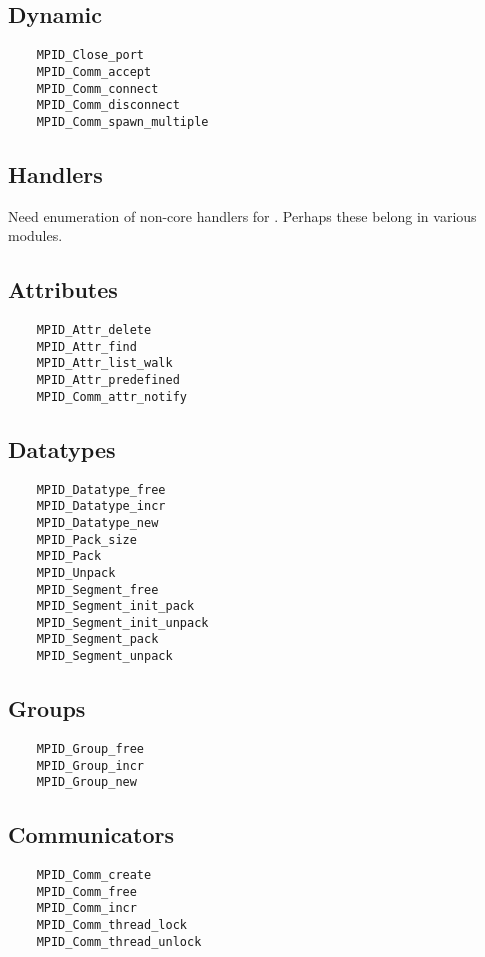 \documentclass{article}
\begin{document}
\subsection{Dynamic}
\begin{verbatim}
    MPID_Close_port
    MPID_Comm_accept
    MPID_Comm_connect
    MPID_Comm_disconnect
    MPID_Comm_spawn_multiple
\end{verbatim}

\subsection{Handlers}
    Need enumeration of non-core handlers for .  Perhaps these 
    belong in various modules.

\subsection{Attributes}
\begin{verbatim}
    MPID_Attr_delete
    MPID_Attr_find
    MPID_Attr_list_walk
    MPID_Attr_predefined
    MPID_Comm_attr_notify
\end{verbatim}


\subsection{Datatypes}
\begin{verbatim}
    MPID_Datatype_free
    MPID_Datatype_incr
    MPID_Datatype_new
    MPID_Pack_size
    MPID_Pack
    MPID_Unpack
    MPID_Segment_free
    MPID_Segment_init_pack
    MPID_Segment_init_unpack
    MPID_Segment_pack
    MPID_Segment_unpack
\end{verbatim}

\subsection{Groups}
\begin{verbatim}
    MPID_Group_free
    MPID_Group_incr
    MPID_Group_new
\end{verbatim}

\subsection{Communicators}
\begin{verbatim}
    MPID_Comm_create
    MPID_Comm_free
    MPID_Comm_incr
    MPID_Comm_thread_lock
    MPID_Comm_thread_unlock
\end{verbatim}
\end{document}
